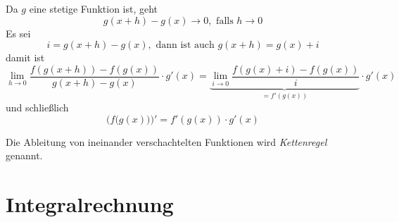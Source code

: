 Da $g$ eine stetige Funktion ist, geht
\begin{equation*}
g(x+h)-g(x) \longrightarrow 0,\text{ falls } h\rightarrow 0
\end{equation*}
Es sei 
\begin{equation}
i = g(x+h)-g(x), \text{ dann ist auch } g(x+h) = g(x)+i
\end{equation}
damit ist
\begin{equation}
\lim_{h\rightarrow 0} \frac{f(g(x+h))-f(g(x))}{g(x+h)-g(x)} \cdot g'(x) = 
\underbrace{\lim_{i\rightarrow 0} \frac{f(g(x)+i)-f(g(x))}{i}}_{=f'(g(x))} \cdot g'(x)
\end{equation}
und schließlich
\begin{equation}
\Big(f\big( g(x) \big)\Big)' = f'(g(x))\cdot g'(x)
\end{equation}
\begin{definition}
Die Ableitung von ineinander verschachtelten Funktionen wird \emph{Kettenregel} genannt.
\end{definition}



\chapter{Integralrechnung}


